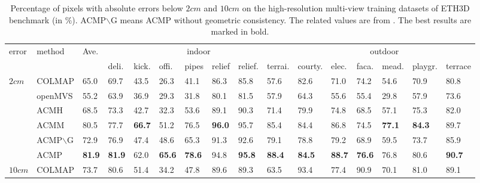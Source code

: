 \documentclass[letterpaper]{article} %
\begin{document}
\begin{table}[t]
	\caption{Percentage of pixels with absolute errors below $2cm$ and $10cm$ on the high-resolution multi-view training datasets of ETH3D benchmark (in $\%$). ACMP$\backslash$G means ACMP without geometric consistency. The related values are from \cite{Xu2018Multi}. The best results are marked in bold.}
	\centering
	\footnotesize
	\begin{tabular}{p{0.6cm}<{\centering}p{1.36cm}<{\centering}p{0.5cm}<{\centering}p{0.5cm}<{\centering}p{0.5cm}<{\centering}p{0.5cm}<{\centering}p{0.45cm}<{\centering}p{0.5cm}<{\centering}p{0.5cm}<{\centering}p{0.5cm}<{\centering}p{0.7cm}<{\centering}p{0.5cm}<{\centering}p{0.5cm}<{\centering}p{0.6cm}<{\centering}p{0.7cm}<{\centering}p{0.7cm}<{\centering}}
		\toprule %
		\multirow{2}{*}{error} & \multirow{2}{*}{method} & \multirow{2}{*}{Ave.} & \multicolumn{7}{c}{indoor} & \multicolumn{6}{c}{outdoor} \\ 
		\cmidrule(lr){4-10} \cmidrule(lr){11-16} %
		& & & deli. & kick. & offi. & pipes & relief & relief. & terrai. & courty. & elec. & faca. & mead. & playgr. & terrace \\
		\midrule %
		\multirow{6}{*}{$2 cm$} & {COLMAP} & 65.0 & 69.7 & {43.5} & 26.3 & 41.1 & 86.3 & 85.8 & 57.6 & {82.6} & 71.0 & {74.2} & 54.6 & 70.9 & 80.8 \\
		& {openMVS} & 55.2 & 63.9 & 36.9 & 29.3 & 31.8 & 80.1 & 81.5 & 57.9 & 64.3 & 55.6 & 55.4 & 29.8 & 57.9 & 73.6 \\
		& {ACMH} & 68.5 & {73.3} & 42.7 & {32.3} & {53.6} & {89.1} & {90.3} & {71.4} & 79.9 & {74.8} & 68.5 & {57.1} & {75.3} & {82.0} \\
		& {ACMM} & 80.5 & {77.7} & {\bf 66.7} & {51.2} & {76.5} & {\bf 96.0} & {95.7} & {85.4} & {84.4} & {86.8} & {74.5} & {\bf 77.1} & {\bf 84.3} & {89.7} \\
		& {ACMP$\backslash$G} & 72.9 & 76.9 & 47.4 & 48.6 & 65.3 & 91.3 & 92.6 & 79.1 & 78.8 & 79.2 & 68.9 & 59.5 & 73.7 & 85.9 \\
		& {ACMP} & {\bf 81.9} & {\bf 81.9} & 62.0 & {\bf 65.6} & {\bf 78.6} & 94.8 & {\bf 95.8} & {\bf 88.4} & {\bf 84.5} & {\bf 88.7} & {\bf 76.6} & 76.8 & 80.6 & {\bf 90.7} \\
		\midrule %
		\multirow{6}{*}{$10 cm$} & {COLMAP} & 73.7 & 80.6 & 51.4 & 34.2 & 47.8 & 89.6 & 89.3 & 63.5 & 93.4 & 77.4 & {90.9} & 70.1 & 81.0 & 89.1 \\

\end{tabular}
\end{table}
\end{document}
